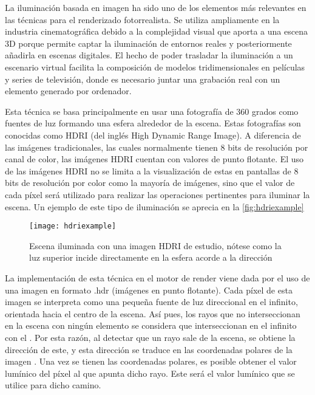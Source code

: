 La iluminación basada en imagen ha sido uno de los elementos más relevantes en las técnicas para el renderizado fotorrealista. Se utiliza ampliamente en la industria cinematográfica debido a la complejidad visual que aporta a una escena 3D porque permite captar la iluminación de entornos reales y posteriormente añadirla en escenas digitales. El hecho de poder trasladar la iluminación a un escenario virtual facilita la composición de modelos tridimensionales en películas y series de televisión, donde es necesario juntar una grabación real con un elemento generado por ordenador.

Esta técnica se basa principalmente en usar una fotografía de 360 grados como fuentes de luz formando una esfera alrededor de la escena. Estas fotografías son conocidas como HDRI (del inglés High Dynamic Range Image). A diferencia de las imágenes tradicionales, las cuales normalmente tienen 8 bits de resolución por canal de color, las imágenes HDRI cuentan con valores de punto flotante. El uso de las imágenes HDRI no se limita a la visualización de estas en pantallas de 8 bits de resolución por color como la mayoría de imágenes, sino que el valor de cada píxel será utilizado para realizar las operaciones pertinentes para iluminar la escena. Un ejemplo de este tipo de iluminación se aprecia en la \autoref{fig:hdriexample}

		
\begin{figure}[H]
	\label{fig:hdriexample}
    \centering
	\texttt{[image: hdriexample]}
	\caption{Escena iluminada con una imagen HDRI de estudio, nótese como la luz superior incide directamente en la esfera acorde a la dirección}
\end{figure}

La implementación de esta técnica en el motor de render viene dada por el uso de una imagen en formato .hdr (imágenes en punto flotante). Cada píxel de esta imagen se interpreta como una pequeña fuente de luz direccional en el infinito, orientada hacia el centro de la escena. Así pues, los rayos que no interseccionan en la escena con ningún elemento se considera que interseccionan en el infinito con el . Por esta razón, al detectar que un rayo sale de la escena, se obtiene la dirección de este, y esta dirección se traduce en las coordenadas polares de la imagen . Una vez se tienen las coordenadas polares, es posible obtener el valor lumínico del píxel al que apunta dicho rayo. Este será el valor lumínico que se utilice para dicho camino.
	

